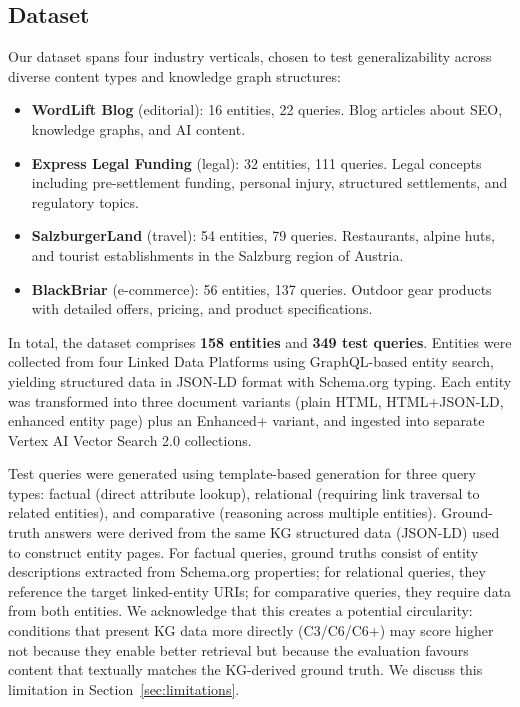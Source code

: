 \documentclass[runningheads]{llncs}
\begin{document}
\subsection{Dataset}
\label{sec:dataset}

Our dataset spans four industry verticals, chosen to test generalizability
across diverse content types and knowledge graph structures:

\begin{itemize}
    \item \textbf{WordLift Blog} (editorial): 16 entities, 22 queries.
          Blog articles about SEO, knowledge graphs, and AI content.
    \item \textbf{Express Legal Funding} (legal): 32 entities, 111 queries.
          Legal concepts including pre-settlement funding, personal injury,
          structured settlements, and regulatory topics.
    \item \textbf{SalzburgerLand} (travel): 54 entities, 79 queries.
          Restaurants, alpine huts, and tourist establishments in the
          Salzburg region of Austria.
    \item \textbf{BlackBriar} (e-commerce): 56 entities, 137 queries.
          Outdoor gear products with detailed offers, pricing, and
          product specifications.
\end{itemize}

In total, the dataset comprises \textbf{158 entities} and \textbf{349
test queries}. Entities were collected from four Linked Data Platforms
using GraphQL-based entity search, yielding structured data in JSON-LD
format with Schema.org typing. Each entity was transformed into three
document variants (plain HTML, HTML+JSON-LD, enhanced entity page) plus
an Enhanced+ variant, and ingested into separate Vertex AI Vector Search
2.0 collections.

Test queries were generated using template-based generation for three
query types: factual (direct attribute lookup), relational (requiring
link traversal to related entities), and comparative (reasoning across
multiple entities).  Ground-truth answers were derived from the same
KG structured data (JSON-LD) used to construct entity pages.  For
factual queries, ground truths consist of entity descriptions extracted
from Schema.org properties; for relational queries, they reference the
target linked-entity URIs; for comparative queries, they require data
from both entities.  We acknowledge that this creates a potential
circularity: conditions that present KG data more directly (C3/C6/C6+)
may score higher not because they enable better retrieval but because
the evaluation favours content that textually matches the KG-derived
ground truth.  We discuss this limitation in Section~\ref{sec:limitations}.
\end{document}
